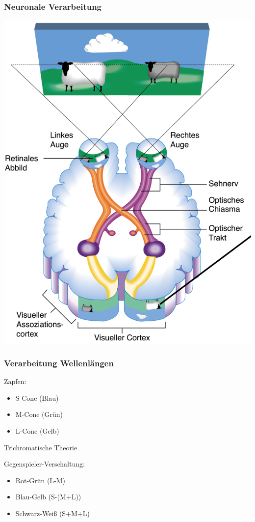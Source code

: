 \subsubsection{Neuronale Verarbeitung}
\begin{center}
	\includegraphics[scale=.2]{img/Auge.png}
\end{center}

\subsubsection{Verarbeitung Wellenlängen}
Zapfen:
\begin{itemize}
	\item S-Cone (Blau)
	\item M-Cone (Grün)
	\item L-Cone (Gelb)
\end{itemize}

\rightarrow Trichromatische Theorie

Gegenspieler-Verschaltung:
\begin{itemize}
	\item Rot-Grün (L-M)
	\item Blau-Gelb (S-(M+L))
	\item Schwarz-Weiß (S+M+L)
\end{itemize}

